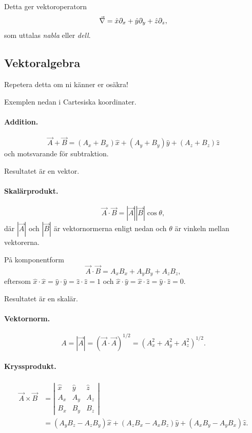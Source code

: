 \documentclass[%
oneside,                 %
final,                   %
10pt]{article}
\begin{document}
Detta ger vektoroperatorn
\begin{equation}
\vec{\nabla} = \hat{x} \partial_x + \hat{y} \partial_y + \hat{z} \partial_z,
\end{equation}
som uttalas \emph{nabla} eller \emph{dell}.

\subsection{Vektoralgebra}

Repetera detta om ni känner er osäkra!

Exemplen nedan i Cartesiska koordinater.

\paragraph{Addition.}
\begin{equation}
\vec{A}+\vec{B} = (A_x + B_x) \hat{x} + (A_y + B_y) \hat{y} + (A_z + B_z) \hat{z}
\end{equation}
och motsvarande för subtraktion. 

Resultatet är en vektor.

\paragraph{Skalärprodukt.}
\begin{equation}
\vec{A} \cdot \vec{B} = |\vec{A}| |\vec{B}| \cos\theta,
\end{equation}
där $|\vec{A}|$ och $|\vec{B}|$ är vektornormerna enligt nedan och $\theta$ är vinkeln mellan vektorerna.

På komponentform
\begin{equation}
\vec{A} \cdot \vec{B} = A_x B_x + A_y B_y + A_z B_z,
\end{equation}
eftersom $\hat{x} \cdot \hat{x} = \hat{y} \cdot \hat{y} = \hat{z} \cdot \hat{z} = 1$ och $\hat{x} \cdot \hat{y} = \hat{x} \cdot \hat{z} = \hat{y} \cdot \hat{z} = 0$.

Resultatet är en skalär.

\paragraph{Vektornorm.}
\begin{equation}
A = |\vec{A}| = (\vec{A} \cdot \vec{A})^{1/2} = (A_x^2 + A_y^2 + A_z^2)^{1/2}.
\end{equation}

\paragraph{Kryssprodukt.}
\begin{align}
\vec{A} \times \vec{B} & = \left| 
\begin{array}{ccc}
\hat{x} & \hat{y} & \hat{z} \\ 
A_x & A_y & A_z \\ 
B_x & B_y & B_z
\end{array}
\right| \\ 
& = (A_y B_z - A_z B_y)\hat{x} + (A_z B_x - A_x B_z)\hat{y} + (A_x B_y - A_y B_x) \hat{z}.
\end{align}
\end{document}
